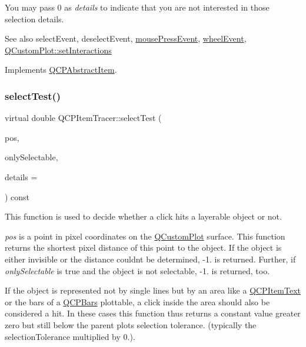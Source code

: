 You may pass 0 as {\itshape details} to indicate that you are not interested in those selection details.

\begin{DoxySeeAlso}{See also}
select\+Event, deselect\+Event, \hyperlink{class_q_c_p_layerable_af6567604818db90f4fd52822f8bc8376}{mouse\+Press\+Event}, \hyperlink{class_q_c_p_layerable_a47dfd7b8fd99c08ca54e09c362b6f022}{wheel\+Event}, \hyperlink{class_q_custom_plot_a5ee1e2f6ae27419deca53e75907c27e5}{Q\+Custom\+Plot\+::set\+Interactions} 
\end{DoxySeeAlso}


Implements \hyperlink{class_q_c_p_abstract_item_ae41d0349d68bb802c49104afd100ba2a}{Q\+C\+P\+Abstract\+Item}.

\mbox{\label{class_q_c_p_item_tracer_a690bdc69b630e01a16cdd03a883bebbf}} 
\subsubsection{\texorpdfstring{select\+Test()}{selectTest()}\hspace{0.1cm}{\footnotesize\ttfamily [2/2]}}
{\footnotesize\ttfamily virtual double Q\+C\+P\+Item\+Tracer\+::select\+Test (\begin{DoxyParamCaption}\item[{const Q\+PointF \&}]{pos,  }\item[{bool}]{only\+Selectable,  }\item[{Q\+Variant $\ast$}]{details = {} }\end{DoxyParamCaption}) const\hspace{0.3cm}{\ttfamily [virtual]}}

This function is used to decide whether a click hits a layerable object or not.

{\itshape pos} is a point in pixel coordinates on the \hyperlink{class_q_custom_plot}{Q\+Custom\+Plot} surface. This function returns the shortest pixel distance of this point to the object. If the object is either invisible or the distance couldn\textquotesingle{}t be determined, -\/1. is returned. Further, if {\itshape only\+Selectable} is true and the object is not selectable, -\/1. is returned, too.

If the object is represented not by single lines but by an area like a \hyperlink{class_q_c_p_item_text}{Q\+C\+P\+Item\+Text} or the bars of a \hyperlink{class_q_c_p_bars}{Q\+C\+P\+Bars} plottable, a click inside the area should also be considered a hit. In these cases this function thus returns a constant value greater zero but still below the parent plot\textquotesingle{}s selection tolerance. (typically the selection\+Tolerance multiplied by 0.).

